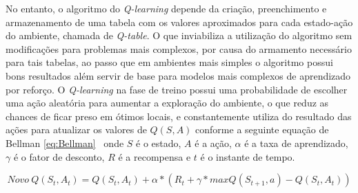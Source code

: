 No entanto, o algoritmo do \textit{Q-learning} depende da criação, preenchimento e armazenamento de uma tabela com os valores aproximados para cada estado-ação do ambiente, chamada de \textit{Q-table}. O que inviabiliza a utilização do algoritmo sem modificações para problemas mais complexos, por causa do armamento necessário para tais tabelas, ao passo que em ambientes mais simples o algoritmo possui bons resultados além servir de base para modelos mais complexos de aprendizado por reforço. O \textit{Q-learning} na fase de treino possui uma probabilidade de escolher uma ação aleatória para aumentar a exploração do ambiente, o que reduz as chances de ficar preso em ótimos locais, e constantemente utiliza do resultado das ações para atualizar os valores de $Q(S, A)$ conforme a seguinte equação de Bellman \ref{eq:Bellman}~\citep{Bellman_1954} onde $S$ é o estado, $A$ é a ação, $\alpha$ é a taxa de aprendizado, $\gamma$ é o fator de desconto, $R$ é a recompensa e $t$ é o instante de tempo.

\begin{equation}
	\label{eq:Bellman}
	Novo \ Q(S_{t}, A_{t}) = Q(S_{t}, A_{t}) + \alpha * (R_{t} + \gamma * maxQ(S_{t+1}, a) - Q(S_{t}, A_{t}))
\end{equation}
